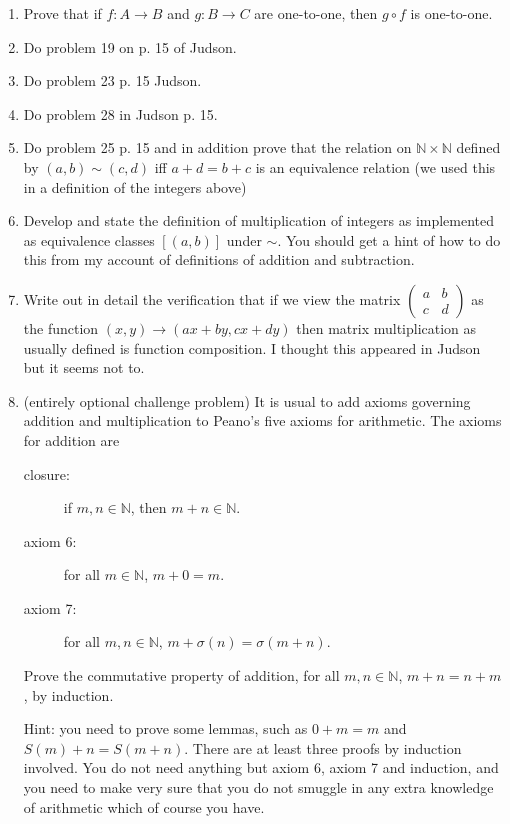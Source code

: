 \documentclass[12pt]{article}
\begin{document}
\begin{enumerate}

\item  Prove that if $f:A \rightarrow B$ and $g:B \rightarrow C$ are one-to-one, then $g \circ f$ is one-to-one.

\item   Do problem 19 on p. 15 of Judson.

\item  Do problem 23 p. 15 Judson.

\item  Do problem 28 in Judson p. 15.

\item Do problem 25 p. 15 and in addition prove that the relation on $\mathbb N \times \mathbb N$ defined by $(a,b) \sim (c,d)$ iff $a+d = b+c$ is an equivalence relation (we used this in a definition of the integers above)

\item  Develop and state the definition of multiplication of integers as implemented as equivalence classes $[(a,b)]$ under $\sim$.  You should get a hint of how to do this from my account of definitions of addition and subtraction.

\item Write out in detail the verification that if we view the matrix $\left(\begin{array}{cc} a & b \\ c & d \end{array}\right)$ as the function $(x,y) \rightarrow (ax+by,cx+dy)$ then matrix multiplication as usually defined is function composition.  I thought this appeared in Judson but it seems not to.


\item (entirely optional challenge problem)  It is usual to add axioms governing addition and multiplication to Peano's five axioms for arithmetic.  The axioms for addition are

\begin{description}

\item[closure:]  if $m,n \in \mathbb N$, then $m+n \in \mathbb N$.

\item[axiom 6:] for all $m \in \mathbb N$, $m+0=m$.

\item[axiom 7:]  for all $m,n \in \mathbb N$, $m+\sigma(n) = \sigma(m+n)$.

\end{description}

Prove the commutative property of addition, for all $m,n \in \mathbb N$, $m+n = n+m$, by induction.

Hint:  you need to prove some lemmas, such as $0+m = m$ and $S(m)+n = S(m+n)$.  There are at least three proofs by induction involved.  You do not need anything but axiom 6, axiom 7 and induction, and you need to make very sure that you do not smuggle in any extra knowledge of arithmetic which of course you have.

\end{enumerate}
\end{document}
